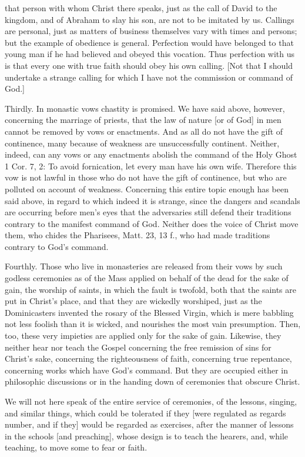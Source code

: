 that person with whom Christ there speaks, just as the call of David
to the kingdom, and of Abraham to slay his son, are not to be
imitated by us.  Callings are personal, just as matters of business
themselves vary with times and persons; but the example of obedience
is general.  Perfection would have belonged to that young man if he
had believed and obeyed this vocation.  Thus perfection with us is
that every one with true faith should obey his own calling.  [Not
that I should undertake a strange calling for which I have not the
commission or command of God.]

Thirdly.  In monastic vows chastity is promised.  We have said above,
however, concerning the marriage of priests, that the law of nature
[or of God] in men cannot be removed by vows or enactments.  And as
all do not have the gift of continence, many because of weakness are
unsuccessfully continent.  Neither, indeed, can any vows or any
enactments abolish the command of the Holy Ghost 1 Cor. 7, 2: To
avoid fornication, let every man have his own wife.  Therefore this
vow is not lawful in those who do not have the gift of continence,
but who are polluted on account of weakness.  Concerning this entire
topic enough has been said above, in regard to which indeed it is
strange, since the dangers and scandals are occurring before men's
eyes that the adversaries still defend their traditions contrary to
the manifest command of God.  Neither does the voice of Christ move
them, who chides the Pharisees, Matt. 23, 13 f., who had made
traditions contrary to God's command.

Fourthly.  Those who live in monasteries are released from their vows
by such godless ceremonies as of the Mass applied on behalf of the
dead for the sake of gain, the worship of saints, in which the fault
is twofold, both that the saints are put in Christ's place, and that
they are wickedly worshiped, just as the Dominicasters invented the
rosary of the Blessed Virgin, which is mere babbling not less foolish
than it is wicked, and nourishes the most vain presumption.  Then,
too, these very impieties are applied only for the sake of gain.
Likewise, they neither hear nor teach the Gospel concerning the free
remission of sins for Christ's sake, concerning the righteousness of
faith, concerning true repentance, concerning works which have God's
command.  But they are occupied either in philosophic discussions or
in the handing down of ceremonies that obscure Christ.

We will not here speak of the entire service of ceremonies, of the
lessons, singing, and similar things, which could be tolerated if
they [were regulated as regards number, and if they] would be
regarded as exercises, after the manner of lessons in the schools
[and preaching], whose design is to teach the hearers, and, while
teaching, to move some to fear or faith.

